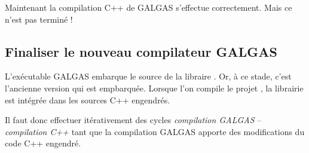 Maintenant la compilation C++ de GALGAS s'effectue correctement. Mais ce n'est pas terminé !

\subsection{Finaliser le nouveau compilateur GALGAS}

L'exécutable GALGAS embarque le source de la libraire . Or, à ce stade, c'est l'ancienne version qui est empbarquée. Lorsque l'on compile le projet , la librairie  est intégrée dans les sources C++ engendrés. 

Il faut donc effectuer itérativement des cycles \emph{compilation GALGAS} -- \emph{compilation C++} tant que la compilation GALGAS apporte des modifications du code C++ engendré.

